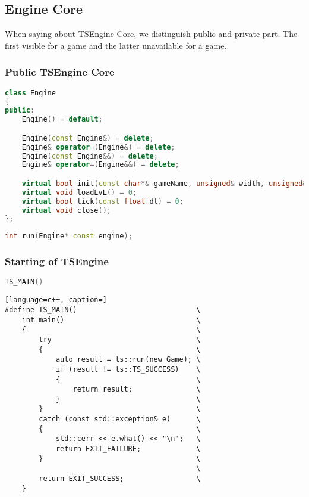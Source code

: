 \newpage
\subsection{Engine Core}
\label{sec:engine_core}
When saying about TSEngine Core, we distinguish public and private part. The first visible for a game and the latter unavailable for a game.
\subsubsection{Public TSEngine Core}
\label{sec:engine_class}
\begin{lstlisting}[language=c++, caption=Engine class (./engine/include/tsengine/core.h)]
class Engine
{
public:
    Engine() = default;

    Engine(const Engine&) = delete;
    Engine& operator=(Engine&) = delete;
    Engine(const Engine&&) = delete;
    Engine& operator=(Engine&&) = delete;

    virtual bool init(const char*& gameName, unsigned& width, unsigned& height);
    virtual void loadLvL() = 0;
    virtual bool tick(const float dt) = 0;
    virtual void close();
};
\end{lstlisting}

\label{sec:run_fun}
\begin{lstlisting}[language=c++, caption=Run function (./engine/include/tsengine/core.h)]
int run(Engine* const engine);
\end{lstlisting}

\newpage

\subsubsection{Starting of TSEngine}
\begin{lstlisting}[language=c++, caption=Start of the Example Game (./game/game.cpp)]
TS_MAIN()
\end{lstlisting}

\begin{lstlisting}[language=c++, caption=]
#define TS_MAIN()                            \
    int main()                               \
    {                                        \
        try                                  \
        {                                    \
            auto result = ts::run(new Game); \
            if (result != ts::TS_SUCCESS)    \
            {                                \
                return result;               \
            }                                \
        }                                    \
        catch (const std::exception& e)      \
        {                                    \
            std::cerr << e.what() << "\n";   \
            return EXIT_FAILURE;             \
        }                                    \
                                             \
        return EXIT_SUCCESS;                 \
    }
\end{lstlisting}

